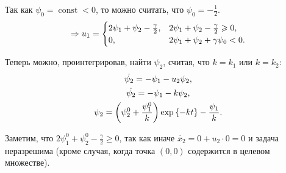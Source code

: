 \documentclass[11pt]{article}
\newcommand{\const}{\ensuremath{\operatorname{const}}}
\begin{document}
Так как $\psi_0 = \const < 0$, то можно считать, что $\psi_0 = -\tfrac{1}{2}$.
\begin{gather}
\Rightarrow u_1 = 
\begin{cases}
2\psi_1 + \psi_2 - \frac{\gamma}{2}, & 2\psi_1 + \psi_2 - \frac{\gamma}{2} \geqslant 0, \\
0, & 2\psi_1 + \psi_2 + \gamma\psi_0 < 0.
\end{cases} \notag
\end{gather}

Теперь можно, проинтегрировав, найти $\psi_2$, считая, что $k = k_1$ или $k = k_2$:
\begin{gather}
\dot{\psi_2} = -\psi_1 - u_2 \psi_2, \notag \\
\dot{\psi_2} = -\psi_1 - k \psi_2, \notag \\
\psi_2 = \left( \psi_2^0 + \frac{\psi_1^0}{k} \right) \exp \left\{ -kt \right\} - \frac{\psi_1}{k}. \notag
\end{gather}

Заметим, что $2\psi_1^0 + \psi_2^0 - \tfrac{\gamma}{2} \geqslant 0$, так как иначе $\dot{x_2} = 0 + u_2 \cdot 0 = 0$ и задача неразрешима (кроме случая, когда точка $\left( 0, 0 \right)$ содержится в целевом множестве).
\end{document}
